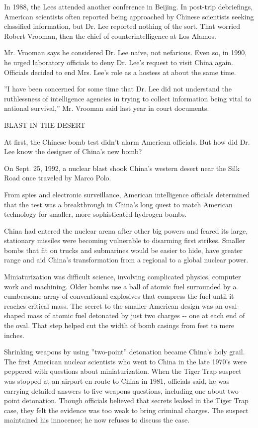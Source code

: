 In 1988, the Lees attended another conference in Beijing. In post-trip
debriefings, American scientists often reported being approached by
Chinese scientists seeking classified information, but Dr. Lee reported
nothing of the sort. That worried Robert Vrooman, then the chief of
counterintelligence at Los Alamos.

Mr. Vrooman says he considered Dr. Lee naïve, not nefarious. Even so, in
1990, he urged laboratory officials to deny Dr. Lee's request to visit
China again. Officials decided to end Mrs. Lee's role as a hostess at
about the same time.

''I have been concerned for some time that Dr. Lee did not understand
the ruthlessness of intelligence agencies in trying to collect
information being vital to national survival,'' Mr. Vrooman said last
year in court documents.

BLAST IN THE DESERT

At first, the Chinese bomb test didn't alarm American officials. But how
did Dr. Lee know the designer of China's new bomb?

On Sept. 25, 1992, a nuclear blast shook China's western desert near the
Silk Road once traveled by Marco Polo.

From spies and electronic surveillance, American intelligence officials
determined that the test was a breakthrough in China's long quest to
match American technology for smaller, more sophisticated hydrogen
bombs.

China had entered the nuclear arena after other big powers and feared
its large, stationary missiles were becoming vulnerable to disarming
first strikes. Smaller bombs that fit on trucks and submarines would be
easier to hide, have greater range and aid China's transformation from a
regional to a global nuclear power.

Miniaturization was difficult science, involving complicated physics,
computer work and machining. Older bombs use a ball of atomic fuel
surrounded by a cumbersome array of conventional explosives that
compress the fuel until it reaches critical mass. The secret to the
smaller American design was an oval-shaped mass of atomic fuel detonated
by just two charges -\/- one at each end of the oval. That step helped
cut the width of bomb casings from feet to mere inches.

Shrinking weapons by using ''two-point'' detonation became China's holy
grail. The first American nuclear scientists who went to China in the
late 1970's were peppered with questions about miniaturization. When the
Tiger Trap suspect was stopped at an airport en route to China in 1981,
officials said, he was carrying detailed answers to five weapons
questions, including one about two-point detonation. Though officials
believed that secrets leaked in the Tiger Trap case, they felt the
evidence was too weak to bring criminal charges. The suspect maintained
his innocence; he now refuses to discuss the case.


